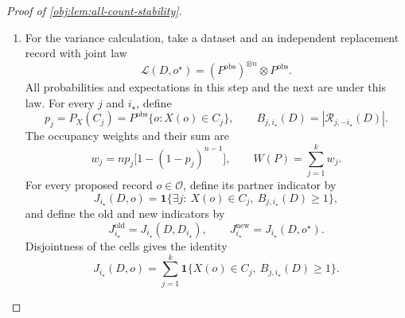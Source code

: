\begin{proof}[Proof of \cref{obj:lem:all-count-stability}]
\begin{enumerate}
If \(D\) and \(D'\) have replacement Hamming distance one, their set of differing positions is a singleton. Write its position as \(i_\star\); then
\[
D_i=D_i'\qquad(i\ne i_\star).
\]
The erased cell tuples are therefore identical, and hence
\[
F_{\kappa,j}^{(-i_\star)}(D)
=F_{\kappa,j}^{(-i_\star)}(D').
\]
If the erased position belongs to the cell, reversing its insertion and applying the joint insertion bound gives
\[
\sum_{\kappa\in\{K_N,K_D\}}
\left|F_{\kappa,j}(D)-F_{\kappa,j}^{(-i_\star)}(D)\right|
\le6\,\mathbf1\{X(D_{i_\star})\in C_j\}.
\]
If it belongs elsewhere, the erased and original tuples coincide and the left side is zero. Applying this bound to both datasets and using their common erased contribution gives
\[
\sum_{\kappa\in\{K_N,K_D\}}
|F_{\kappa,j}(D)-F_{\kappa,j}(D')|
\le
6\,\mathbf1\{X(D_{i_\star})\in C_j\}
+6\,\mathbf1\{X(D'_{i_\star})\in C_j\}.
\]
The cells form a disjoint partition of the public window, so every covariate belongs to at most one cell. Thus
\[
\begin{aligned}
|S_N(D)-S_N(D')|+|S_D(D)-S_D(D')|
&\le\sum_{j=1}^k\sum_{\kappa\in\{K_N,K_D\}}
|F_{\kappa,j}(D)-F_{\kappa,j}(D')|\\
&\le6\sum_{j=1}^k\mathbf1\{X(D_{i_\star})\in C_j\}
+6\sum_{j=1}^k\mathbf1\{X(D'_{i_\star})\in C_j\}\\
&\le12.
\end{aligned}
\]
This argument includes empty cells, singleton cells, and the transition to occupancy two.

\item For the variance calculation, take a dataset and an independent replacement record with joint law
\[
\mathcal L(D,o^\star)
=(P^{\mathrm{obs}})^{\otimes n}\otimes P^{\mathrm{obs}}.
\]
All probabilities and expectations in this step and the next are under this law. For every \(j\) and \(i_\star\), define
\[
p_j=P_X(C_j)
=P^{\mathrm{obs}}\{o:X(o)\in C_j\},
\qquad
B_{j,i_\star}(D)=|\mathscr R_{j,-i_\star}(D)|.
\]
The occupancy weights and their sum are
\[
w_j=np_j\bigl[1-(1-p_j)^{n-1}\bigr],
\qquad
W(P)=\sum_{j=1}^k w_j.
\]
For every proposed record \(o\in\mathcal O\), define its partner indicator by
\[
J_{i_\star}(D,o)
=
\mathbf1\{\exists j:\ X(o)\in C_j,\ B_{j,i_\star}(D)\ge1\},
\]
and define the old and new indicators by
\[
J_{i_\star}^{\mathrm{old}}=J_{i_\star}(D,D_{i_\star}),
\qquad
J_{i_\star}^{\mathrm{new}}=J_{i_\star}(D,o^\star).
\]
Disjointness of the cells gives the identity
\[
J_{i_\star}(D,o)
=\sum_{j=1}^k
\mathbf1\{X(o)\in C_j,\ B_{j,i_\star}(D)\ge1\}.
\]


\end{enumerate}
\end{proof}
